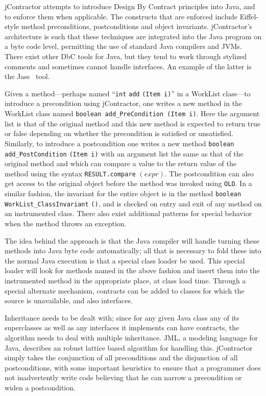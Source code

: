 \documentclass{article}
\begin{document}
\begin{multicols}{2}
jContractor attempts to introduce Design By Contract principles into
Java, and to enforce them when applicable.  The constructs that are
enforced include Eiffel-style method preconditions, postconditions and
object invariants.  jContractor's architecture is such that these
techniques are integrated into the Java program on a byte code level,
permitting the use of standard Java compilers and JVMs.  There exist
other DbC tools for Java, but they tend to work through stylized
comments and sometimes cannot handle interfaces.  An example of the
latter is the Jass~\cite{detlef99jass} tool.

Given a method---perhaps named ``\texttt{int} \texttt{add}
\texttt{(Item i)}'' in a WorkList class---to introduce a precondition
using jContractor, one writes a new method in the WorkList class named
\texttt{boolean add\_PreCondition (Item i)}.  Here the argument list
is that of the original method and this new method is expected to
return true or false depending on whether the precondition is
satisfied or unsatisfied.  Similarly, to introduce a postcondition one
writes a new method \texttt{boolean} \texttt{add\_PostCondition}
\texttt{(Item i)} with an argument list the same as that of the
original method and which can compare a value to the return value of
the method using the syntax \texttt{RESULT.compare} $(expr)$.  The
postcondition can also get access to the original object before the
method was invoked using \texttt{OLD}.  In a similar fashion, the
invariant for the entire object is in the method \texttt{boolean}
\texttt{WorkList\_ClassInvariant} \texttt{()}, and is checked on entry
and exit of any method on an instrumented class.  There also exist
additional patterns for special behavior when the method throws an
exception.

The idea behind the approach is that the Java compiler will handle
turning these methods into Java byte code automatically; all that is
necessary to fold these into the normal Java execution is that a
special class loader be used.  This special loader will look for
methods named in the above fashion and insert them into the
instrumented method in the appropriate place, at class load time.
Through a special alternate mechanism, contracts can be added to
classes for which the source is unavailable, and also interfaces.

Inheritance needs to be dealt with; since for any given Java class any
of its superclasses as well as any interfaces it implements can have
contracts, the algorithm needs to deal with multiple inheritance.
JML\cite{burdy03overview}, a modeling language for Java, describes an
robust lattice based algorithm for handling this.  jContractor simply
takes the conjunction of all preconditions and the disjunction of all
postconditions, with some important heuristics to ensure that a
programmer does not inadvertently write code believing that he can
narrow a precondition or widen a postcondition.


\end{multicols}
\end{document}

